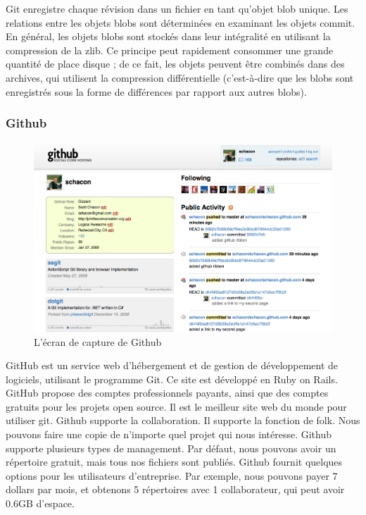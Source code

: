 Git enregistre chaque révision dans un fichier en tant qu'objet blob unique. Les relations entre les objets blobs sont déterminées en examinant les objets commit. En général, les objets blobs sont stockés dans leur intégralité en utilisant la compression de la zlib. Ce principe peut rapidement consommer une grande quantité de place disque ; de ce fait, les objets peuvent être combinés dans des archives, qui utilisent la compression différentielle (c'est-à-dire que les blobs sont enregistrés sous la forme de différences par rapport aux autres blobs).

\subsubsection{Github} %


\begin{figure}[htbp]
	\centering
		\includegraphics[width=6in]{Image/githubCapture.png}
	\caption{L'écran de capture de Github}
	\label{fig:Image_githubCapture}
\end{figure}


GitHub est un service web d'hébergement et de gestion de développement de logiciels, utilisant le programme Git. Ce site est développé en Ruby on Rails. GitHub propose des comptes professionnels payants, ainsi que des comptes gratuits pour les projets open source. Il est le meilleur site web du monde pour utiliser git. Github supporte la collaboration. Il supporte la fonction de folk. Nous pouvons faire une copie de n'importe quel projet qui nous intéresse. Github supporte plusieurs types de management. Par défaut, nous pouvons avoir un répertoire gratuit, mais tous nos fichiers sont publiés. Github fournit quelques options pour les utilisateurs d'entreprise. Par exemple, nous pouvons payer 7 dollars par mois, et obtenons 5 répertoires avec 1 collaborateur, qui peut avoir 0.6GB d'espace. 

